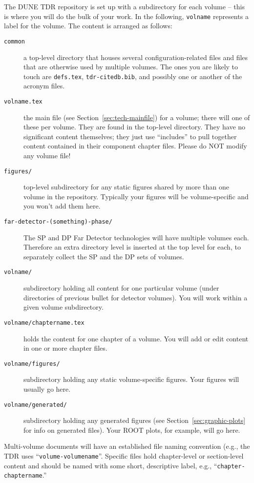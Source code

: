 The DUNE TDR repository is set up with a subdirectory for each volume -- this is where you will do the bulk of your work. In the following, \texttt{volname} represents a label for the volume. The content is
arranged as follows:

\begin{description}
\item[\texttt{common}] a top-level directory that houses several configuration-related files and files that are otherwise used by multiple volumes. The ones you are likely to touch are \texttt{defs.tex}, \texttt{tdr-citedb.bib}, and possibly one or another of the acronym files.
\item[\texttt{volname.tex}] the main file (see Section~\ref{sec:tech-mainfile}) for a volume; there will one of these per volume. They are found in the top-level
  directory. They have no significant content themselves; they just use
  ``includes'' to pull together content contained in their component chapter files. Please do NOT modify any volume file!
\item[\texttt{figures/}] top-level subdirectory for any static figures
  shared by more than one volume in the repository. Typically your figures will be volume-specific and you won't add them here.
\item[\texttt{far-detector-(something)-phase/}] The SP and DP Far Detector technologies will have multiple volumes each. Therefore an extra directory level is inserted at the top level for each, to separately collect the SP and the DP sets of volumes.  
\item[\texttt{volname/}] subdirectory holding all content for one particular volume (under directories of previous bullet for detector volumes). You will work within a given volume subdirectory. 
\item[\texttt{volname/chaptername.tex}] holds the content for one chapter of a volume. You will add or edit content in one or more chapter files.
\item[\texttt{volname/figures/}] subdirectory holding any static volume-specific figures. Your figures will usually go here.
\item[\texttt{volname/generated/}] subdirectory holding any generated
  figures (see Section~\ref{sec:graphic-plots} for info on generated files). Your ROOT plots, for example, will go here.
\end{description}

Multi-volume documents will have an established file naming convention (e.g., the
TDR uses ``\texttt{volume-volumename}''.
Specific files hold chapter-level or section-level content and should be named with some
short, descriptive label, e.g., ``\texttt{chapter-chaptername}.''

